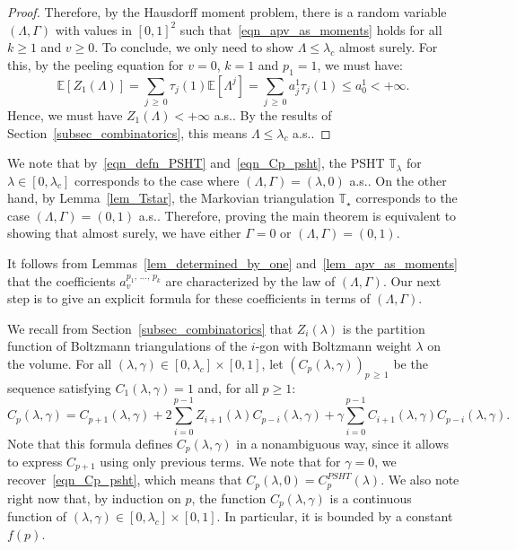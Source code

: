 \documentclass[AHL,Unicode,longabstracts,published]{cedram}
\newcommand{\TT}{\mathbb{T}}
\newcommand{\E}{\mathbb{E}}
\begin{document}
\begin{proof}
Therefore, by the Hausdorff moment problem, there is a random variable $(\Lambda, \Gamma)$ with values in $[0,1]^2$ such that~\eqref{eqn_apv_as_moments} holds for all $k \geq 1$ and $v \geq 0$. To conclude, we only need to show $\Lambda \leq \lambda_c$ almost surely. For this, by the peeling equation for $v=0$, $k=1$ and $p_1=1$, we must have:
\[
\E \left[Z_1(\Lambda) \right] = \sum_{j\,\geq\,0} \tau_j(1) \E \left[\Lambda^j \right] = \sum_{j\, \geq\,0} a^1_{j} \tau_j(1) \leq a_0^1 < +\infty.
\]
Hence, we must have $Z_1(\Lambda) <+\infty$ a.s.. By the results of Section~\ref{subsec_combinatorics}, this means $\Lambda \leq \lambda_c$ a.s..
\end{proof}

We note that by~\eqref{eqn_defn_PSHT} and~\eqref{eqn_Cp_psht}, the PSHT $\TT_{\lambda}$ for $\lambda \in [0,\lambda_c]$ corresponds to the case where $(\Lambda,\Gamma)=(\lambda,0)$ a.s.. On the other hand, by Lemma~\ref{lem_Tstar}, the Markovian triangulation $\TT_{\star}$ corresponds to the case $(\Lambda,\Gamma)=(0,1)$ a.s.. Therefore, proving the main theorem is equivalent to showing that almost surely, we have either $\Gamma=0$ or $(\Lambda,\Gamma)=(0,1)$.

It follows from Lemmas~\ref{lem_determined_by_one} and~\ref{lem_apv_as_moments} that the coefficients $a_v^{p_1,\,\dots,\,p_k}$ are characterized by the law of $(\Lambda, \Gamma)$. Our next step is to give an explicit formula for these coefficients in terms of $(\Lambda, \Gamma)$.

We recall from Section~\ref{subsec_combinatorics} that $Z_i(\lambda)$ is the partition function of Boltzmann triangulations of the $i$-gon with Boltzmann weight $\lambda$ on the volume. For all $(\lambda, \gamma) \in [0,\lambda_c] \times [0,1]$, let $(C_p(\lambda,\gamma))_{p\,\geq\,1}$ be the sequence satisfying $C_1(\lambda,\gamma)=1$ and, for all $p \geq 1$:
\begin{equation}\label{eqn_peeling_Cp}
C_p(\lambda,\gamma) = C_{p+1}(\lambda,\gamma) + 2 \sum_{i=0}^{p-1} Z_{i+1}(\lambda) C_{p-i}(\lambda,\gamma) + \gamma \sum_{i=0}^{p-1} C_{i+1}(\lambda, \gamma) C_{p-i}(\lambda, \gamma).
\end{equation}
Note that this formula defines $C_p(\lambda, \gamma)$ in a nonambiguous way, since it allows to express $C_{p+1}$ using only previous terms. We note that for $\gamma=0$, we recover~\eqref{eqn_Cp_psht}, which means that $C_p(\lambda,0)=C_p^{PSHT}(\lambda)$. We also note right now that, by induction on $p$, the function $C_p(\lambda, \gamma)$ is a continuous function of $(\lambda, \gamma) \in [0,\lambda_c] \times [0,1]$. In particular, it is bounded by a constant $f(p)$.
\end{document}
